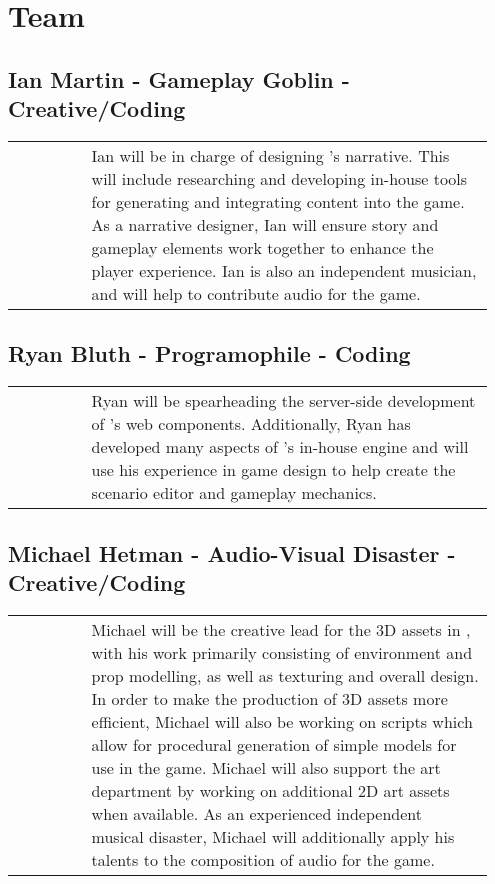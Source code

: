 \section{Team}
\subsection{Ian Martin - Gameplay Goblin - Creative/Coding}
\begin{tabular}{m{0.15\linewidth} m{0.8\linewidth}}
\raisebox{-\linewidth}{\texttt{[image: images/ian]}} & Ian will be in charge of designing \ourgame{}'s narrative. This will include researching and developing in-house tools for generating and integrating content into the game. As a narrative designer, Ian will ensure story and gameplay elements work together to enhance the player experience. Ian is also an independent musician, and will help to contribute audio for the game.\\
\end{tabular}

\subsection{Ryan Bluth - Programophile - Coding}
\begin{tabular}{m{0.15\linewidth} m{0.8\linewidth}}
\raisebox{-\linewidth}{\texttt{[image: images/ryan]}} & Ryan will be spearheading the server-side development of \ourgame{}'s web components. Additionally, Ryan has developed many aspects of \ourteam{}'s in-house engine and will use his experience in game design to help create the scenario editor and gameplay mechanics.\\
\end{tabular}

\subsection{Michael Hetman - Audio-Visual Disaster - Creative/Coding}
\begin{tabular}{m{0.15\linewidth} m{0.8\linewidth}}
\raisebox{-\linewidth}{\texttt{[image: images/michael]}} & Michael will be the creative lead for the 3D assets in \ourgame{}, with his work primarily consisting of environment and prop modelling, as well as texturing and overall design. In order to make the production of 3D assets more efficient, Michael will also be working on scripts which allow for procedural generation of simple models for use in the game. Michael will also support the art department by working on additional 2D art assets when available. As an experienced independent musical disaster, Michael will additionally apply his talents to the composition of audio for the game.\\
\end{tabular}

